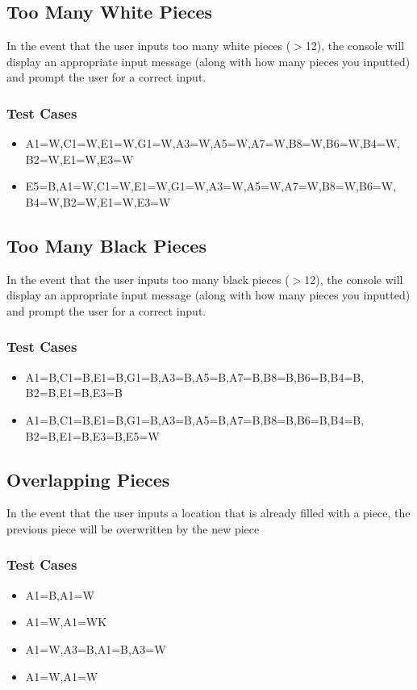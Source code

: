 \documentclass{article}
\begin{document}
\subsection{Too Many White Pieces}
In the event that the user inputs too many white pieces ($>$12), the console will display an appropriate input message (along with how many pieces you inputted) and prompt the user for a correct input.

\subsubsection{Test Cases}
\begin{itemize}
\item A1=W,C1=W,E1=W,G1=W,A3=W,A5=W,A7=W,B8=W,B6=W,B4=W,
B2=W,E1=W,E3=W
\item E5=B,A1=W,C1=W,E1=W,G1=W,A3=W,A5=W,A7=W,B8=W,B6=W,
B4=W,B2=W,E1=W,E3=W
\end{itemize}

\subsection{Too Many Black Pieces}
In the event that the user inputs too many black pieces ($>$12), the console will display an appropriate input message (along with how many pieces you inputted) and prompt the user for a correct input.

\subsubsection{Test Cases}
\begin{itemize}
\item A1=B,C1=B,E1=B,G1=B,A3=B,A5=B,A7=B,B8=B,B6=B,B4=B, \\
B2=B,E1=B,E3=B
\item A1=B,C1=B,E1=B,G1=B,A3=B,A5=B,A7=B,B8=B,B6=B,B4=B, \\
B2=B,E1=B,E3=B,E5=W
\end{itemize}

\subsection{Overlapping Pieces}
In the event that the user inputs a location that is already filled with a piece, the previous piece will be overwritten by the new piece
\subsubsection{Test Cases}
\begin{itemize}
\item A1=B,A1=W
\item A1=W,A1=WK
\item A1=W,A3=B,A1=B,A3=W
\item A1=W,A1=W
\end{itemize}
\end{document}
